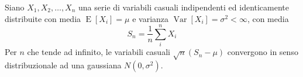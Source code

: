 \documentclass{article}
\begin{document}
Siano $X_1, X_2, \ldots, X_n$ una serie di variabili casuali indipendenti ed
identicamente distribuite con media $\operatorname{E}[X_i] = \mu$ e varianza
$\operatorname{Var}[X_i] = \sigma^2 < \infty$, con media
\begin{equation*}
S_n = \frac{1}{n}\sum_{i}^{n} X_i
\end{equation*}
Per $n$ che tende ad infinito, le variabili casuali
$\sqrt{n}(S_n - \mu)$ convergono in senso distribuzionale
ad una gaussiana $N(0, \sigma^2)$.

\end{document}

